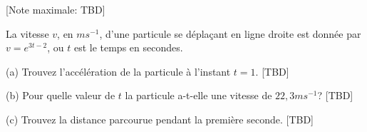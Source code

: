 \begin{question}
  \hspace*{\fill} [Note maximale: TBD]\par
  \medskip
  \noindent La vitesse $v$, en $ms^{-1}$, d’une particule se déplaçant en ligne droite est donnée par $v=e^{3t-2}$, ou $t$ est le temps en secondes.\par
  \medskip
  (a) Trouvez l’accélération de la particule à l’instant $t = 1$.\hspace*{\fill} [TBD]\par
  \medskip
  (b) Pour quelle valeur de $t$ la particule a-t-elle une vitesse de $22,3ms^{-1}$?\hspace*{\fill} [TBD]\par
  \medskip
  (c) Trouvez la distance parcourue pendant la première seconde.\hspace*{\fill} [TBD]\par
\end{question}

